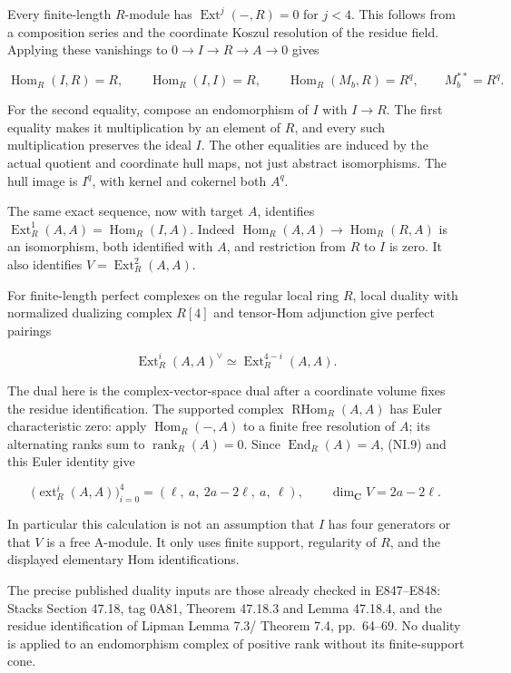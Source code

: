 Every finite-length \(R\)-module has \(\operatorname{Ext}^j(-,R)=0\) for \(j<4\). This follows
from a composition series and the coordinate Koszul resolution of
the residue field. Applying these vanishings to \(0\to I\to R\to A\to 0\) gives

\[
 \operatorname{Hom}_R(I,R)=R,\qquad
 \operatorname{Hom}_R(I,I)=R,\qquad
 \operatorname{Hom}_R(M_b,R)=R^q,\qquad
 M_b^{**}=R^q.
 \tag{NI.8}
\]

For the second equality, compose an endomorphism of \(I\) with \(I\to R\).
The first equality makes it multiplication by an element of \(R\),
and every such multiplication preserves the ideal \(I\). The other
equalities are induced by the actual quotient and coordinate hull
maps, not just abstract isomorphisms. The hull image is \(I^q\), with
kernel and cokernel both \(A^q\).

The same exact sequence, now with target \(A\), identifies
\(\operatorname{Ext}^1_R(A,A)=\operatorname{Hom}_R(I,A)\). Indeed \(\operatorname{Hom}_R(A,A)\to \operatorname{Hom}_R(R,A)\) is an
isomorphism, both identified with \(A\), and restriction from \(R\) to \(I\)
is zero. It also identifies \(V=\operatorname{Ext}^2_R(A,A)\).

For finite-length perfect complexes on the regular local ring \(R\),
local duality with normalized dualizing complex \(R[4]\) and tensor-Hom
adjunction give perfect pairings

\[
 \operatorname{Ext}^i_R(A,A)^\vee
       \simeq\operatorname{Ext}^{4-i}_R(A,A).
 \tag{NI.9}
\]

The dual here is the complex-vector-space dual after a coordinate
volume fixes the residue identification. The supported complex
\(\operatorname{RHom}_R(A,A)\) has Euler characteristic zero: apply \(\operatorname{Hom}_R(-,A)\) to
a finite free resolution of \(A\); its alternating ranks sum to
\(\operatorname{rank}_R(A)=0\). Since \(\operatorname{End}_R(A)=A\), (NI.9) and this Euler identity give

\[
 \bigl(\operatorname{ext}^i_R(A,A)\bigr)_{i=0}^4
        =(\ell,\ a,\ 2a-2\ell,\ a,\ \ell),
 \qquad \dim_{\mathbf C}V=2a-2\ell.
 \tag{NI.10}
\]

In particular this calculation is not an assumption that \(I\) has
four generators or that \(V\) is a free A-module. It only uses finite
support, regularity of \(R\), and the displayed elementary Hom
identifications.

The precise published duality inputs are those already checked in
E847--E848: Stacks Section 47.18, tag 0A81, Theorem 47.18.3 and
Lemma 47.18.4,\cite{SFStacksE847LocalDuality} and the residue identification of Lipman Lemma 7.3/
Theorem 7.4, pp.~64--69.\cite{SFLipman1984} No duality is applied to an endomorphism
complex of positive rank without its finite-support cone.

